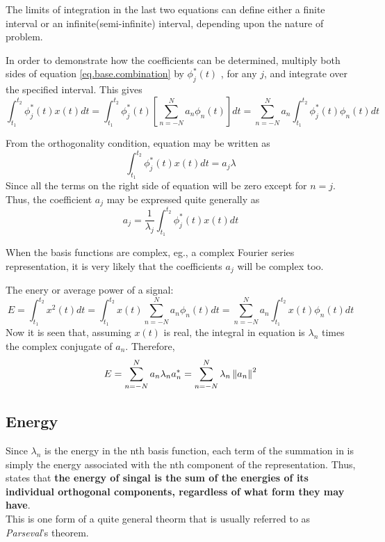 \documentclass{article}
\begin{document}
The limits of integration in the last two equations can define either a finite interval or an infinite(semi-infinite) interval, 
depending upon the nature of problem.

In order to demonstrate how the coefficients can be determined, multiply both sides of equation \eqref{eq.base.combination} by $\phi_j^{*}(t)$ , for any $j$, and integrate over the specified interval. This gives
\begin{equation}
\int_{t_1}^{t_2} \phi_j^{*}(t)x(t)dt 
= \int_{t_1}^{t_2} \phi_j^{*}(t) [\sum_{n = -N}^N a_n \phi_n(t)] dt 
= \sum_{n = -N}^N a_n \int_{t_1}^{t_2} \phi_j^{*}(t) \phi_n(t) dt 
\end{equation}

From the orthogonality condition, equation \lasteq may be written as
$$ \int_{t_1}^{t_2} \phi_j^{*}(t) x(t) dt = a_j \lambda $$
Since all the terms on the right side of equation \lasteq will be zero except for $n = j$. Thus, the coefficient $a_j$ may be expressed quite generally as
\begin{equation}
a_j = \frac{1}{\lambda_j} \int_{t_1}^{t_2} \phi_j^*(t) x(t) dt
\end{equation}

When the basis functions are complex, eg., a complex Fourier series representation, it is very likely that the coefficients $a_j$ will be complex too.

The enery or average power of a signal:
\begin{equation}
E 
= \int_{t_1}^{t_2}x^2(t)dt
= \int_{t_1}^{t_2}x(t) \sum_{n = -N}^N a_n \phi_n(t) dt
= \sum_{n = -N}^N a_n \int_{t_1}^{t_2}x(t) \phi_n(t) dt
\end{equation}
Now it is seen that, assuming $x(t)$ is real, the integral in equation \lasteq is $\lambda_n$ times the complex conjugate of $a_n$. Therefore,
\begin{equation}
E
= \sum_{n = -N}^N a_n \lambda_n a_n^* = \sum_{n = -N}^N \lambda_n \left\Vert a_n\right\Vert^2
\end{equation}

\subsection{Energy}
Since $\lambda_n$ is the energy in the nth basis function, 
each term of the summation in \lasteq is simply the energy associated with the nth component of the representation. 
Thus, \lasteq states that \textbf{the energy of singal is the sum of the energies of its individual orthogonal components, regardless of what form they may have}. \\
This is one form of a quite general theorm that is usually referred to as \textit{Parseval}'s theorem.
\end{document}
